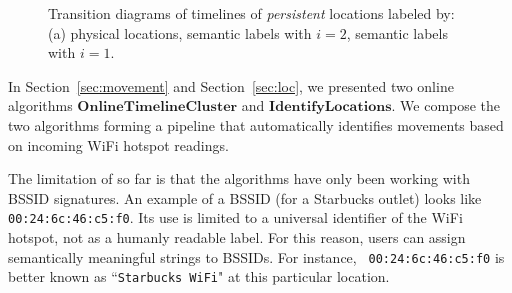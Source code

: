 \begin{figure}[t]
    \centering
    \caption{Transition diagrams of timelines of {\em persistent} locations labeled by: (a)
        physical locations, semantic labels with $i=2$, semantic labels with
        $i=1$.}
\end{figure}

In Section~\ref{sec:movement} and Section~\ref{sec:loc}, we presented two online
algorithms $\mathbf{OnlineTimelineCluster}$ and $\mathbf{IdentifyLocations}$.
We compose the two algorithms forming a pipeline that automatically identifies
movements based on incoming WiFi hotspot readings.

The limitation of so far is that the algorithms have only been working with
BSSID signatures.  An example of a BSSID (for a Starbucks outlet) looks like 
{\tt 00:24:6c:46:c5:f0}.  Its use is limited to a universal identifier of the
WiFi hotspot, not as a humanly readable label.  For this reason, users can
assign semantically meaningful strings to BSSIDs.  For instance, {\tt
00:24:6c:46:c5:f0} is better known as ``{\tt Starbucks WiFi}" at this particular
location.


